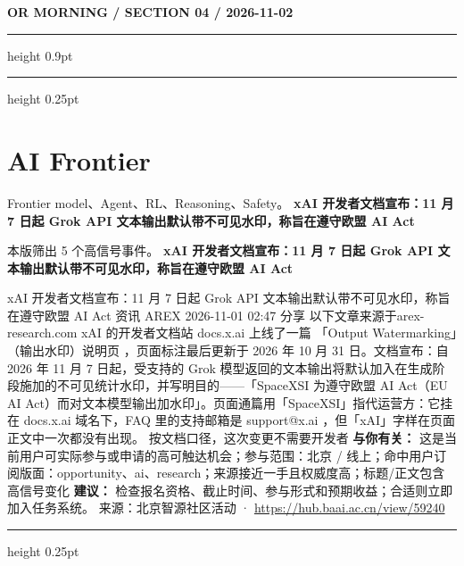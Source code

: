\documentclass[10.5pt]{ctexart}
\begin{document}
\newpage
{\small\bfseries OR MORNING / SECTION 04 / 2026-11-02}
\vspace{2mm}
\hrule height 0.9pt
\vspace{1.5mm}
\hrule height 0.25pt
\vspace{4mm}
\section*{AI Frontier}
{\color{ormuted} Frontier model、Agent、RL、Reasoning、Safety。}
\vspace{2mm}
{\LARGE\bfseries xAI 开发者文档宣布：11 月 7 日起 Grok API 文本输出默认带不可见水印，称旨在遵守欧盟 AI Act}\par
\vspace{1mm}
{\color{ormuted} 本版筛出 5 个高信号事件。}
\vspace{3mm}
{\Large\bfseries xAI 开发者文档宣布：11 月 7 日起 Grok API 文本输出默认带不可见水印，称旨在遵守欧盟 AI Act}\par
xAI 开发者文档宣布：11 月 7 日起 Grok API 文本输出默认带不可见水印，称旨在遵守欧盟 AI Act 资讯 AREX 2026-11-01 02:47 分享 以下文章来源于arex-research.com xAI 的开发者文档站 docs.x.ai 上线了一篇 「Output Watermarking」（输出水印）说明页 ，页面标注最后更新于 2026 年 10 月 31 日。文档宣布：自 2026 年 11 月 7 日起，受支持的 Grok 模型返回的文本输出将默认加入在生成阶段施加的不可见统计水印，并写明目的——「SpaceXSI 为遵守欧盟 AI Act（EU AI Act）而对文本模型输出加水印」。页面通篇用「SpaceXSI」指代运营方：它挂在 docs.x.ai 域名下，FAQ 里的支持邮箱是 support@x.ai ，但「xAI」字样在页面正文中一次都没有出现。 按文档口径，这次变更不需要开发者
\textbf{与你有关：} 这是当前用户可实际参与或申请的高可触达机会；参与范围：北京 / 线上；命中用户订阅版面：opportunity、ai、research；来源接近一手且权威度高；标题/正文包含高信号变化
\textbf{建议：} 检查报名资格、截止时间、参与形式和预期收益；合适则立即加入任务系统。
{\footnotesize\color{ormuted} 来源：北京智源社区活动 · \url{https://hub.baai.ac.cn/view/59240}}
\vspace{4mm}
\hrule height 0.25pt
\vspace{3mm}
\end{document}
